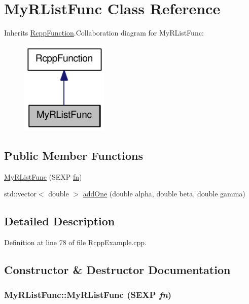 \hypertarget{classMyRListFunc}{
\section{MyRListFunc Class Reference}
\label{classMyRListFunc}
}


Inherits \hyperlink{classRcppFunction}{RcppFunction}.Collaboration diagram for MyRListFunc:\nopagebreak
\begin{figure}[H]
\begin{center}
\leavevmode
\includegraphics[width=118pt]{classMyRListFunc__coll__graph}
\end{center}
\end{figure}
\subsection*{Public Member Functions}
\begin{DoxyCompactItemize}
\item 
\hyperlink{classMyRListFunc_a7ab78b186d110497a404f88009455af6}{MyRListFunc} (SEXP \hyperlink{classRcppFunction_aa6b5966224b8b7d158be6cdfc3612063}{fn})
\item 
std::vector$<$ double $>$ \hyperlink{classMyRListFunc_a0dec3b59e1e235c0502594a5d92cae13}{addOne} (double alpha, double beta, double gamma)
\end{DoxyCompactItemize}


\subsection{Detailed Description}


Definition at line 78 of file RcppExample.cpp.

\subsection{Constructor \& Destructor Documentation}
\hypertarget{classMyRListFunc_a7ab78b186d110497a404f88009455af6}{
\subsubsection[{MyRListFunc}]{\setlength{\rightskip}{0pt plus 5cm}MyRListFunc::MyRListFunc (SEXP {\em fn})}}
\label{classMyRListFunc_a7ab78b186d110497a404f88009455af6}


